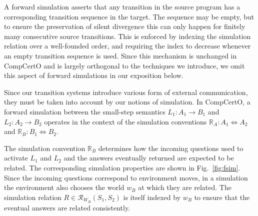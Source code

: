 \documentclass[acmsmall,authordraft]{acmart}
\newcommand{\kw}[1]{\ensuremath{ \mathsf{#1} }}
\begin{document}

A forward simulation asserts that any transition in the source program
has a corresponding transition sequence in the target.
The sequence may be empty,
but to ensure the preservation of silent divergence
this can only happen for finitely many consecutive source transitions.
This is enforced by indexing the simulation relation
over a well-founded order,
and requiring the index to decrease
whenever an empty transition sequence is used.
Since this mechanism is unchanged in CompCertO
and is largely orthogonal to the techniques we introduce,
we omit this aspect of forward simulations
in our exposition below.

Since our transition systems introduce
various form of external communication,
they must be taken into account by our notions of simulation.
In CompCertO,
a forward simulation between the small-step semantics
$L_1 : A_1 \rightarrow B_1$ and
$L_2 : A_2 \rightarrow B_2$
operates in the context of the simulation conventions
$\mathbb{R}_A : A_1 \Leftrightarrow A_2$ and
$\mathbb{R}_B : B_1 \Leftrightarrow B_2$.

The simulation convention $\mathbb{R}_B$
determines how
the incoming questions used to activate $L_1$ and $L_2$ and
the answers eventually returned
are expected to be related.
The corresponding simulation properties
are shown in Fig.~\ref{fig:fsim}.
Since the incoming questions correspond to environment moves,
in a simulation the environment also chooses the world $w_B$
at which they are related.
The simulation relation $R \in \mathcal{R}_{W_B}(S_1, S_2)$
is itself indexed by $w_B$
to ensure that the eventual answers
are related consistently.
\end{document}
